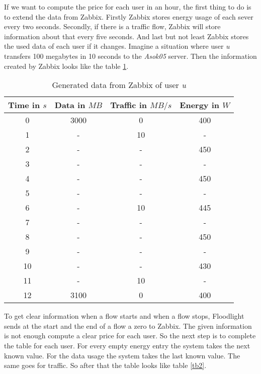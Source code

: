  If we want to compute the price for each user in an hour, the first thing to do is to extend the data from Zabbix. Firstly Zabbix stores energy usage of each sever every two seconds. Secondly, if there is a traffic flow, Zabbix will store information about that every five seconds. And last but not least Zabbix stores the used data of each user if it changes. Imagine a situation where user \textit{u} transfers 100 megabytes in 10 seconds to the \textit{Asok05} server. Then the information created by Zabbix looks like the table \ref{tb1}. 
\begin{table}
\centering
\caption{Generated data from Zabbix of user \textit{u}}
\begin{tabular}{|c|c|c|c|}
 \hline Time in $s$ & Data in $MB$ & Traffic in $MB/s$ & Energy in $W$ \\ 
  \hline 0 & 3000 & 0 & 400 \\ 
 \hline 1 & - & 10 & - \\ 
 \hline 2 & - & - & 450 \\ 
 \hline 3 & - & - & -\\ 
 \hline 4 & - & - & 450 \\ 
 \hline 5 & - & - & - \\
 \hline 6 & - & 10 & 445 \\ 
 \hline 7 & - & - & -\\ 
 \hline 8 & - & - & 450 \\ 
 \hline 9 & - & - & - \\  
 \hline 10 & - & - & 430 \\
  \hline 11 & - & 10 & - \\
 \hline 12 & 3100 & 0 & 400 \\  
 \hline 
 \end{tabular}
 \label{tb1} 
 \end{table}
 
 To get clear information when a flow starts and when a flow stops, Floodlight sends at the start and the end of a flow a zero to Zabbix. The given information is not enough compute a clear price for each user. So the next step is to complete the table for each user. For every empty energy entry the system takes the next known value. For the data usage the system takes the last known value. The same goes for traffic. So after that the table looks like table \ref{tb2}.
 
